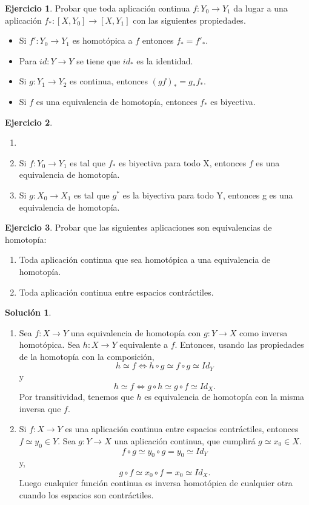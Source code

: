 \documentclass{article}
\theoremstyle{plain}
\theoremstyle{definition}
\newtheorem{exercise}{Ejercicio}
\newtheorem*{sol*}{Solución}
\begin{document}
\newpage
\begin{exercise}
Probar que toda aplicación continua $f:Y_0\to Y_1$ da lugar a una aplicación $f_*:[X,Y_0]\to[X,Y_1]$ con las siguientes propiedades.
\begin{itemize}
\item Si $f':Y_0\to Y_1$ es homotópica a $f$ entonces $f_* =f'_*$.
\item Para $id:Y\to Y$ se tiene que $id_*$ es la identidad.
\item Si $g:Y_1\to Y_2$ es continua, entonces $(gf)_* = g_*f_*$.
\item Si $f$ es una equivalencia de homotopía, entonces $f_*$ es biyectiva.
\end{itemize}
\end{exercise}
\newpage
\begin{exercise}
\begin{enumerate}
\item[]
\item Si $f:Y_0\to Y_1$ es tal que $f_*$ es biyectiva para todo X, entonces $f$ es una equivalencia de homotopía.
\item Si $g:X_0\to X_1$ es tal que $g^*$ es la biyectiva para todo Y, entonces g es una equivalencia de homotopía.
\end{enumerate}
\end{exercise}
\newpage
\begin{exercise}
Probar que las siguientes aplicaciones son equivalencias de homotopía:
\begin{enumerate}
\item Toda aplicación continua que sea homotópica a una equivalencia de homotopía.
\item Toda aplicación continua entre espacios contráctiles.
\end{enumerate}
\end{exercise}
\begin{sol*}
\begin{enumerate}\
\item Sea $f:X\to Y$ una equivalencia de homotopía con $g:Y\to X$ como inversa homotópica. Sea $h:X\to Y$ equivalente a $f$. Entonces, usando las propiedades de la homotopía con la composición, 
\[
h\simeq f\Leftrightarrow h\circ g\simeq f\circ g\simeq Id_Y
\]
y
\[
h\simeq f\Leftrightarrow g\circ h\simeq g\circ f\simeq Id_X.
\]
Por transitividad, tenemos que $h$ es equivalencia de homotopía con la misma inversa que $f$. 
\item Si $f:X\to Y$ es una aplicación continua entre espacios contráctiles, entonces $f\simeq y_0\in Y$. Sea $g:Y\to X$ una aplicación continua, que cumplirá $g\simeq x_0\in X$. 
\[
f\circ g\simeq y_0\circ g = y_0\simeq Id_Y
\]
y,
\[
g\circ f\simeq x_0\circ f =x_0\simeq Id_X.
\]
Luego cualquier función continua es inversa homotópica de cualquier otra cuando los espacios son contráctiles. 
\end{enumerate}
\end{sol*}
\end{document}

